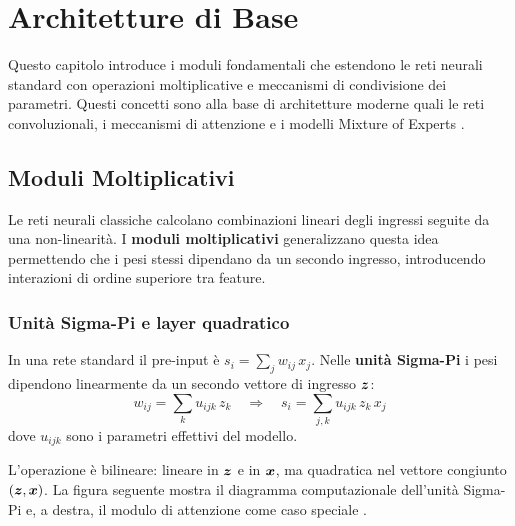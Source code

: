 \chapter{Architetture di Base}
\label{ch:basic-arch}

Questo capitolo introduce i moduli fondamentali che estendono le reti neurali
standard con operazioni moltiplicative e meccanismi di condivisione dei
parametri. Questi concetti sono alla base di architetture moderne quali le reti
convoluzionali, i meccanismi di attenzione e i modelli Mixture of Experts
\citep{bishop2024, lecun2021}.

\section{Moduli Moltiplicativi}
\label{sec:multiplicative}

Le reti neurali classiche calcolano combinazioni lineari degli ingressi seguite
da una non-linearità. I \textbf{moduli moltiplicativi} generalizzano questa
idea permettendo che i pesi stessi dipendano da un secondo ingresso,
introducendo interazioni di ordine superiore tra feature.

\subsection{Unità Sigma-Pi e layer quadratico}

\begin{definizione}
In una rete standard il pre-input è $s_i = \sum_j w_{ij}\, x_j$.
Nelle \textbf{unità Sigma-Pi} i pesi dipendono linearmente da un secondo
vettore di ingresso $\boldsymbol{z}$:
\begin{equation}
  w_{ij} = \sum_k u_{ijk}\, z_k
  \quad\Longrightarrow\quad
  s_i = \sum_{j,k} u_{ijk}\, z_k\, x_j
\end{equation}
dove $u_{ijk}$ sono i parametri effettivi del modello.
\end{definizione}

L'operazione è bilineare: lineare in $\boldsymbol{z}$ e in $\boldsymbol{x}$, ma quadratica
nel vettore congiunto $(\boldsymbol{z}, \boldsymbol{x})$. La figura seguente mostra il
diagramma computazionale dell'unità Sigma-Pi e, a destra, il modulo di
attenzione come caso speciale .

